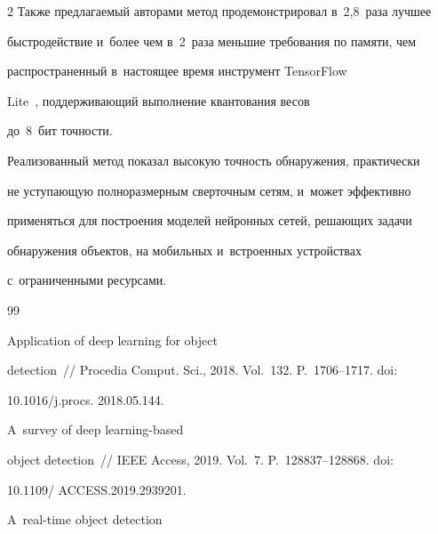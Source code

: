 \begin{multicols}{2}
  Также предлагаемый авторами метод продемонстрировал в~2,8~раза лучшее 


быст\-ро\-дей\-ст\-вие и~более чем в~2~раза меньшие требования по памяти, чем 


рас\-про\-стра\-нен\-ный в~на\-сто\-ящее время инструмент TensorFlow  


Lite~\cite{15-mal}, под\-дер\-жи\-ва\-ющий выполнение квантования весов 


до~8~бит точ\-ности.


  


  Реализованный метод показал высокую точ\-ность обнаружения, практически 


не усту\-па\-ющую пол\-но\-раз\-мер\-ным сверточным сетям, и~может эффективно 


применяться для по\-стро\-ения моделей нейронных сетей, ре\-ша\-ющих задачи 


обнаружения объектов, на мобильных и~встро\-ен\-ных устройствах 


с~ограниченными ре\-сур\-сами.


  


{\small\frenchspacing


 {\baselineskip=10.7pt




 \begin{thebibliography}{99}




 Application of deep learning for object 


detection~// Procedia Comput. Sci., 2018. Vol.~132. P.~1706--1717. doi: 


10.1016/j.procs. 2018.05.144.







 A~survey of deep learning-based 


object detection~// IEEE Access, 2019. Vol.~7. P.~128837--128868. doi: 


10.1109/ \mbox{ACCESS}.2019.2939201.




 A~real-time object detection 



\end{thebibliography}}}
\end{multicols}
